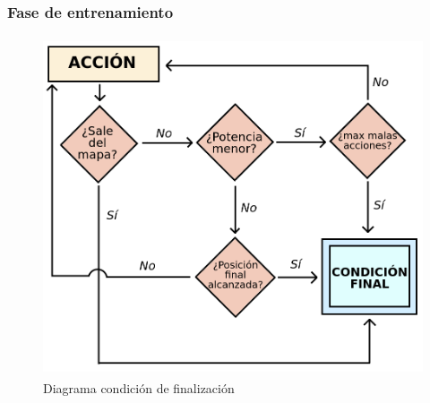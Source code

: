 \subsubsection{Fase de entrenamiento}
\label{subsubsec:train}

\begin{figure} [t]
    \begin{center}
    \includegraphics[height=10cm]{imagenes/cap4/11_diagrama_training.png}
    \end{center}
    \caption[Diagrama condición de finalización]{Diagrama condición de finalización}
    \label{fig:training_phase}
\end{figure}

